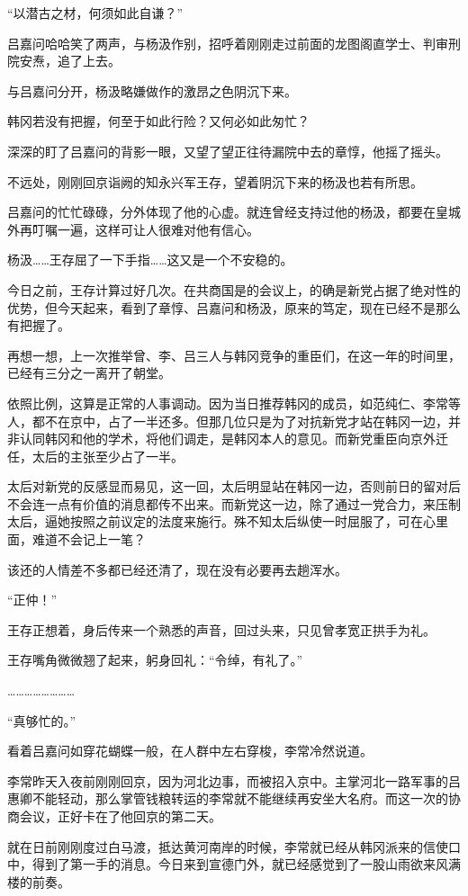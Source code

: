 “以潜古之材，何须如此自谦？”

吕嘉问哈哈笑了两声，与杨汲作别，招呼着刚刚走过前面的龙图阁直学士、判审刑院安焘，追了上去。

与吕嘉问分开，杨汲略嫌做作的激昂之色阴沉下来。

韩冈若没有把握，何至于如此行险？又何必如此匆忙？

深深的盯了吕嘉问的背影一眼，又望了望正往待漏院中去的章惇，他摇了摇头。

不远处，刚刚回京诣阙的知永兴军王存，望着阴沉下来的杨汲也若有所思。

吕嘉问的忙忙碌碌，分外体现了他的心虚。就连曾经支持过他的杨汲，都要在皇城外再叮嘱一遍，这样可让人很难对他有信心。

杨汲……王存屈了一下手指……这又是一个不安稳的。

今日之前，王存计算过好几次。在共商国是的会议上，的确是新党占据了绝对性的优势，但今天起来，看到了章惇、吕嘉问和杨汲，原来的笃定，现在已经不是那么有把握了。

再想一想，上一次推举曾、李、吕三人与韩冈竞争的重臣们，在这一年的时间里，已经有三分之一离开了朝堂。

依照比例，这算是正常的人事调动。因为当日推荐韩冈的成员，如范纯仁、李常等人，都不在京中，占了一半还多。但那几位只是为了对抗新党才站在韩冈一边，并非认同韩冈和他的学术，将他们调走，是韩冈本人的意见。而新党重臣向京外迁任，太后的主张至少占了一半。

太后对新党的反感显而易见，这一回，太后明显站在韩冈一边，否则前日的留对后不会连一点有价值的消息都传不出来。而新党这一边，除了通过一党合力，来压制太后，逼她按照之前议定的法度来施行。殊不知太后纵使一时屈服了，可在心里面，难道不会记上一笔？

该还的人情差不多都已经还清了，现在没有必要再去趟浑水。

“正仲！”

王存正想着，身后传来一个熟悉的声音，回过头来，只见曾孝宽正拱手为礼。

王存嘴角微微翘了起来，躬身回礼：“令绰，有礼了。”

……………………

“真够忙的。”

看着吕嘉问如穿花蝴蝶一般，在人群中左右穿梭，李常冷然说道。

李常昨天入夜前刚刚回京，因为河北边事，而被招入京中。主掌河北一路军事的吕惠卿不能轻动，那么掌管钱粮转运的李常就不能继续再安坐大名府。而这一次的协商会议，正好卡在了他回京的第二天。

就在日前刚刚度过白马渡，抵达黄河南岸的时候，李常就已经从韩冈派来的信使口中，得到了第一手的消息。今日来到宣德门外，就已经感觉到了一股山雨欲来风满楼的前奏。

